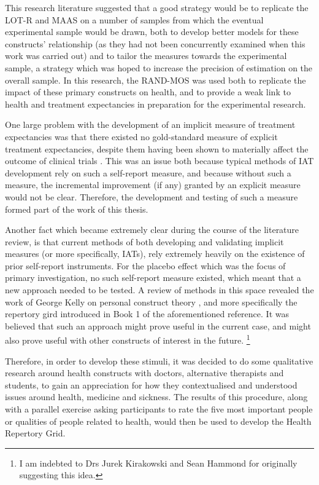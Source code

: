 This research literature suggested that a good strategy would be to replicate the LOT-R and MAAS on a number of samples from which the eventual experimental sample would be drawn, both to develop better models for these constructs' relationship (as they had not been concurrently examined when this work was carried out) and to tailor the measures towards the experimental sample, a strategy which was hoped to increase the precision of estimation on the overall sample. In this research, the RAND-MOS was used both to replicate the impact of these primary constructs on health, and to provide a weak link to health and treatment expectancies in preparation for the experimental research. 

One large problem with the development of an implicit measure of treatment expectancies was that there existed no gold-standard measure of explicit treatment expectancies, despite them having been shown to materially affect the outcome of clinical trials \cite{Linde2007,Bausell2005,Benedetti2005}. This was an issue both because typical methods of IAT development rely on such a self-report measure, and because without such a measure, the incremental improvement (if any) granted by an explicit measure would not be clear. Therefore, the development and testing of such a measure formed part of the work of this thesis. 

Another fact which became extremely clear during the course of the literature review, is that current methods of both developing and validating implicit measures (or more specifically, IATs), rely extremely heavily on the existence of prior self-report instruments. For the placebo effect which was the focus of primary investigation, no such self-report measure existed, which meant that a new approach needed to be tested. A review of methods in this space revealed the work of George Kelly on personal construct theory \cite{Kelly1991}, and more specifically the repertory gird introduced in Book 1 of the aforementioned reference. It was believed that such an approach might prove useful in the current case, and might also prove useful with other constructs of interest in the future. \footnote{I am indebted to Drs Jurek Kirakowski and Sean Hammond for originally suggesting this idea.}

Therefore, in order to develop these stimuli, it was decided to do some qualitative research around health constructs with doctors, alternative therapists and students, to gain an appreciation for how they contextualised and understood issues around health, medicine and sickness. The results of this procedure, along with a parallel exercise asking participants to rate the five most important people or qualities of people related to health, would then be used to develop the Health Repertory Grid. 

